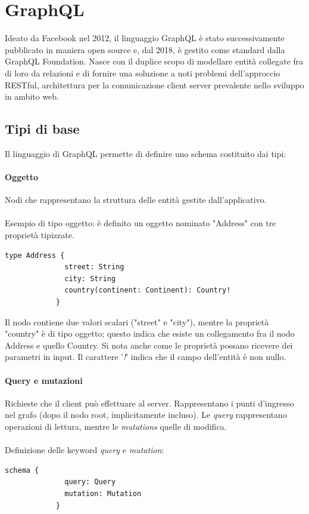 \documentclass[a4paper, 12pt]{report}
\begin{document}
    \section{GraphQL}
      Ideato da Facebook nel 2012, il linguaggio GraphQL è stato successivamente pubblicato in maniera open source e, dal 2018, è gestito come standard dalla GraphQL Foundation.
      Nasce con il duplice scopo di modellare entità collegate fra di loro da relazioni e di fornire una soluzione a noti problemi dell'approccio RESTful, architettura per la comunicazione client server prevalente nello sviluppo in ambito web.
      \subsection{Tipi di base}
      Il linguaggio di GraphQL permette di definire uno schema costituito dai tipi:
        \paragraph*{Oggetto} 
          Nodi che rappresentano la struttura delle entità gestite dall'applicativo.
        \paragraph*{}
          Esempio di tipo oggetto: è definito un oggetto nominato "Address" con tre proprietà tipizzate.
          \begin{Verbatim}[samepage=true]
            type Address {
              street: String
              city: String
              country(continent: Continent): Country!
            }
          \end{Verbatim}
          Il nodo contiene due valori scalari ("street" e "city"), mentre la proprietà "country" è di tipo oggetto; questo indica che esiste un collegamento fra il nodo Address e quello Country. Si nota anche come le proprietà possano ricevere dei parametri in input.
          Il carattere '\emph{!}' indica che il campo dell'entità è non nullo.
        \paragraph*{Query e mutazioni} 
          Richieste che il client può effettuare al server. Rappresentano i punti d'ingresso nel grafo (dopo il nodo root, implicitamente incluso). Le \emph{query} rappresentano operazioni di lettura, mentre le \emph{mutations} quelle di modifica.
        \paragraph*{}
          Definizione delle keyword \emph{query} e \emph{mutation}:
          \begin{Verbatim}[samepage=true]
            schema {
              query: Query
              mutation: Mutation
            }
          \end{Verbatim}
\end{document}
